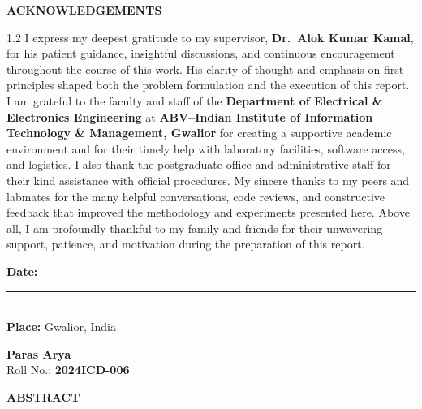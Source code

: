 \documentclass[12pt,a4paper]{report}
\newcommand{\Department}{Department of Electrical \& Electronics Engineering}
\newcommand{\AuthorName}{Paras Arya}
\newcommand{\RollNo}{2024ICD-006}
\newcommand{\Supervisor}{Dr.\ Alok Kumar Kamal}
\newcommand{\InstituteName}{ABV--Indian Institute of Information Technology \& Management, Gwalior}
\newcommand{\InstituteCity}{Gwalior, India}
\begin{document}
\cleardoublepage
{}
\thispagestyle{empty}
\begin{center}
  {\Large \textbf{ACKNOWLEDGEMENTS}}
\end{center}
\vspace{0.9cm}

\begin{center}
\begin{minipage}{0.92\textwidth}
\begin{spacing}{1.2}
{\large
I express my deepest gratitude to my supervisor, \textbf{\Supervisor}, for
his patient guidance, insightful discussions, and continuous encouragement
throughout the course of this work. His clarity of thought and emphasis on
first principles shaped both the problem formulation and the execution of this
report. I am grateful to the faculty and staff of the \textbf{\Department} at
\textbf{\InstituteName} for creating a supportive academic environment and for their timely help with laboratory facilities, software access, and logistics. I also thank the postgraduate office and administrative staff for their kind assistance with official procedures. My sincere thanks to my peers and labmates for the many helpful conversations, code reviews, and constructive feedback that improved the methodology and experiments presented here. Above all, I am profoundly thankful to my family and friends for their unwavering support, patience, and motivation during the preparation of this
report.
}
\end{spacing}
\end{minipage}
\end{center}

\vspace{1.8cm}
\noindent
\begin{minipage}[t]{0.48\textwidth}
  \textbf{Date:} \rule{5cm}{0.4pt}\\[0.6cm]
  \textbf{Place:} \InstituteCity
\end{minipage}\hfill
\begin{minipage}[t]{0.48\textwidth}
  \raggedleft
  \textbf{\AuthorName}\\
  Roll No.: \textbf{\RollNo}
\end{minipage}

\cleardoublepage
{}
\thispagestyle{empty}
\begin{center}
  {\Large \textbf{ABSTRACT}}
\end{center}
\vspace{0.6cm}
\end{document}
